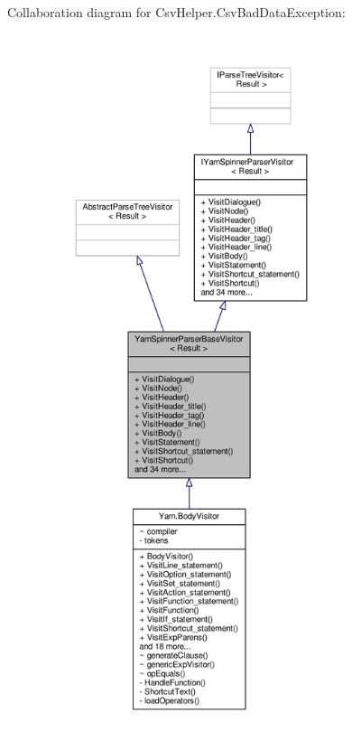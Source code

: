 Collaboration diagram for Csv\-Helper.\-Csv\-Bad\-Data\-Exception\-:
\nopagebreak
\begin{figure}[H]
\begin{center}
\leavevmode
\includegraphics[width=246pt]{a00402}
\end{center}
\end{figure}

